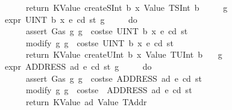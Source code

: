 \begin{isabellebody}
\ \ \ \ \ \ return\ {\isacharparenleft}{\kern0pt}KValue\ {\isacharparenleft}{\kern0pt}createSInt\ b\ x{\isacharparenright}{\kern0pt}{\isacharcomma}{\kern0pt}\ Value\ {\isacharparenleft}{\kern0pt}TSInt\ b{\isacharparenright}{\kern0pt}{\isacharparenright}{\kern0pt}\isanewline
\ \ \ \ {\isacharbraceright}{\kern0pt}{\isacharparenright}{\kern0pt}\ g{\isachardoublequoteclose}\isanewline
{\isacharbar}{\kern0pt}\ {\isachardoublequoteopen}expr\ {\isacharparenleft}{\kern0pt}UINT\ b\ x{\isacharparenright}{\kern0pt}\ e\ cd\ st\ g\ {\isacharequal}{\kern0pt}\isanewline
\ \ \ \ {\isacharparenleft}{\kern0pt}do\ {\isacharbraceleft}{\kern0pt}\isanewline
\ \ \ \ \ \ assert\ Gas\ {\isacharparenleft}{\kern0pt}{\isasymlambda}g{\isachardot}{\kern0pt}\ g\ {\isachargreater}{\kern0pt}\ costs\isactrlsub e\ {\isacharparenleft}{\kern0pt}UINT\ b\ x{\isacharparenright}{\kern0pt}\ e\ cd\ st{\isacharparenright}{\kern0pt}{\isacharsemicolon}{\kern0pt}\isanewline
\ \ \ \ \ \ modify\ {\isacharparenleft}{\kern0pt}{\isasymlambda}g{\isachardot}{\kern0pt}\ g\ {\isacharminus}{\kern0pt}\ costs\isactrlsub e\ {\isacharparenleft}{\kern0pt}UINT\ b\ x{\isacharparenright}{\kern0pt}\ e\ cd\ st{\isacharparenright}{\kern0pt}{\isacharsemicolon}{\kern0pt}\isanewline
\ \ \ \ \ \ return\ {\isacharparenleft}{\kern0pt}KValue\ {\isacharparenleft}{\kern0pt}createUInt\ b\ x{\isacharparenright}{\kern0pt}{\isacharcomma}{\kern0pt}\ Value\ {\isacharparenleft}{\kern0pt}TUInt\ b{\isacharparenright}{\kern0pt}{\isacharparenright}{\kern0pt}\isanewline
\ \ {\isacharbraceright}{\kern0pt}{\isacharparenright}{\kern0pt}\ g{\isachardoublequoteclose}\isanewline
{\isacharbar}{\kern0pt}\ {\isachardoublequoteopen}expr\ {\isacharparenleft}{\kern0pt}ADDRESS\ ad{\isacharparenright}{\kern0pt}\ e\ cd\ st\ g\ {\isacharequal}{\kern0pt}\isanewline
\ \ \ \ {\isacharparenleft}{\kern0pt}do\ {\isacharbraceleft}{\kern0pt}\isanewline
\ \ \ \ \ \ assert\ Gas\ {\isacharparenleft}{\kern0pt}{\isasymlambda}g{\isachardot}{\kern0pt}\ g\ {\isachargreater}{\kern0pt}\ costs\isactrlsub e\ {\isacharparenleft}{\kern0pt}ADDRESS\ ad{\isacharparenright}{\kern0pt}\ e\ cd\ st{\isacharparenright}{\kern0pt}{\isacharsemicolon}{\kern0pt}\isanewline
\ \ \ \ \ \ modify\ {\isacharparenleft}{\kern0pt}{\isasymlambda}g{\isachardot}{\kern0pt}\ g\ {\isacharminus}{\kern0pt}\ costs\isactrlsub e\ \ {\isacharparenleft}{\kern0pt}ADDRESS\ ad{\isacharparenright}{\kern0pt}\ e\ cd\ st{\isacharparenright}{\kern0pt}{\isacharsemicolon}{\kern0pt}\isanewline
\ \ \ \ \ \ return\ {\isacharparenleft}{\kern0pt}KValue\ ad{\isacharcomma}{\kern0pt}\ Value\ TAddr{\isacharparenright}{\kern0pt}\isanewline

\end{isabellebody}
